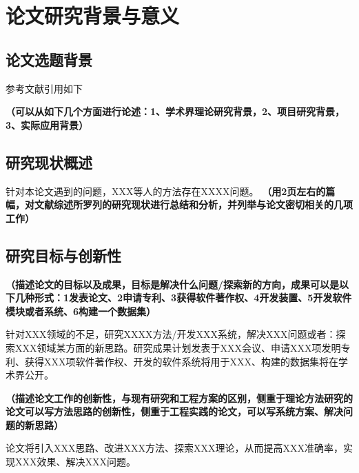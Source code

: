 \section{论文研究背景与意义}

\subsection{论文选题背景}
参考文献引用如下

\textbf{\color{red}（可以从如下几个方面进行论述：1、学术界理论研究背景，2、项目研究背景，3、实际应用背景）}

\subsection{研究现状概述}

针对本论文遇到的问题，XXX等人的方法存在XXXX问题。
\textbf{\color{red}
（用2页左右的篇幅，对文献综述所罗列的研究现状进行总结和分析，并列举与论文密切相关的几项工作）}


\subsection{研究目标与创新性}

\textbf{\color{red}（描述论文的目标以及成果，目标是解决什么问题/探索新的方向，成果可以是以下几种形式：1发表论文、2申请专利、3获得软件著作权、4开发装置、5开发软件模块或者系统、6构建一个数据集）}

针对XXX领域的不足，研究XXXX方法/开发XXX系统，解决XXX问题或者：探索XXX领域某方面的新思路。研究成果计划发表于XXX会议、申请XXX项发明专利、获得XXX项软件著作权、开发的软件系统将用于XXX、构建的数据集将在学术界公开。

\textbf{\color{red}（描述论文工作的创新性，与现有研究和工程方案的区别，侧重于理论方法研究的论文可以写方法思路的创新性，侧重于工程实践的论文，可以写系统方案、解决问题的新思路）}

论文将引入XXX思路、改进XXX方法、探索XXX理论，从而提高XXX准确率，实现XXX效果、解决XXX问题。
